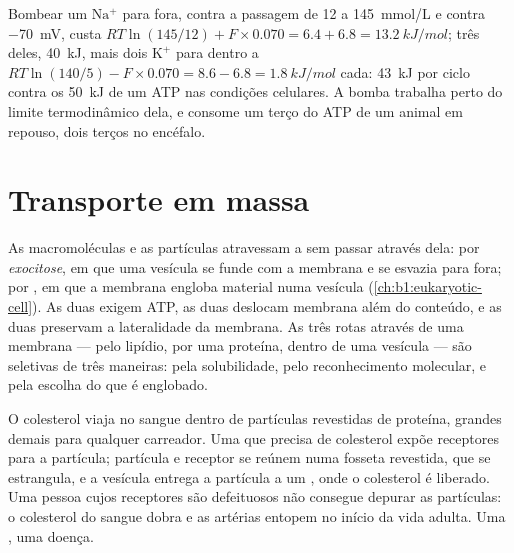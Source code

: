 \begin{example}\label{ex:b1:membranes-transport:pumpcost}
Bombear um $\mathrm{Na^+}$ para fora, contra a passagem de \qty{12}{} a
\qty{145}{mmol/L} e contra \qty{-70}{mV}, custa
$RT\ln(145/12) + F\times 0.070 = 6.4 + 6.8 =
\qty{13.2}{kJ/mol}$; três deles, \qty{40}{kJ}, mais dois
$\mathrm{K^+}$ para dentro a $RT\ln(140/5) - F\times 0.070 = 8.6 - 6.8 =
\qty{1.8}{kJ/mol}$ cada: \qty{43}{kJ} por ciclo contra os \qty{50}{kJ}
de um ATP nas condições celulares. A bomba trabalha perto do limite
termodinâmico dela, e consome um terço do ATP de um animal em repouso,
dois terços no encéfalo.
\end{example}

\section{Transporte em massa}

\begin{proposition}\label{prop:b1:membranes-transport:vesicles}
As macromoléculas e as partículas atravessam a  sem
passar através dela: por \emph{exocitose}, em que uma vesícula se funde
com a membrana e se esvazia para fora; por \emph{}, em que a
membrana engloba material numa vesícula
(\cref{ch:b1:eukaryotic-cell}). As duas exigem ATP, as duas deslocam
membrana além do conteúdo, e as duas preservam a lateralidade da
membrana. As três rotas através de uma membrana --- pelo lipídio, por
uma proteína, dentro de uma vesícula --- são seletivas de três maneiras:
pela solubilidade, pelo reconhecimento molecular, e pela escolha do que
é englobado.
\end{proposition}

\begin{example}\label{ex:b1:membranes-transport:ldl}
O colesterol viaja no sangue dentro de partículas revestidas de proteína,
grandes demais para qualquer carreador. Uma  que precisa de
colesterol expõe receptores para a partícula; partícula e receptor se
reúnem numa fosseta revestida, que se estrangula, e a vesícula entrega a
partícula a um , onde o colesterol é liberado. Uma pessoa cujos
receptores são defeituosos não consegue depurar as partículas: o
colesterol do sangue dobra e as artérias entopem no início da vida
adulta. Uma , uma doença.
\end{example}

